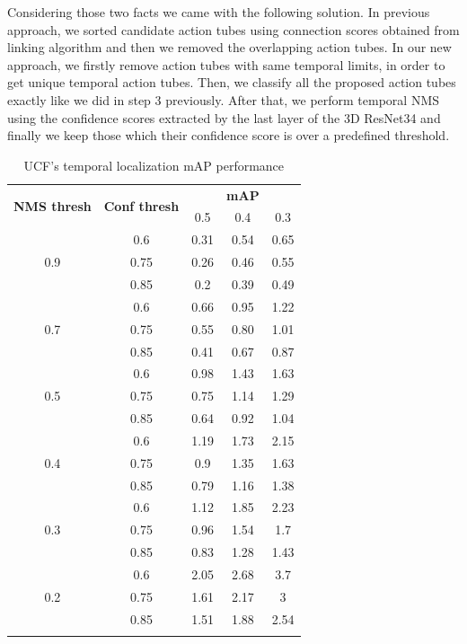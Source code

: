\documentclass{report}
\begin{document}
Considering those two facts we came with the following solution.
In previous approach, we sorted candidate action tubes using connection scores obtained from linking algorithm and then we removed
the overlapping action tubes. In our new approach, we firstly remove action tubes with same temporal limits, in order to get unique
temporal action tubes. Then, we classify all the proposed action tubes exactly like we did in step 3 previously. After that, we
perform temporal NMS using the confidence scores extracted by the last layer of the 3D ResNet34 and finally we keep those which
their confidence score is over a predefined threshold. 

\begin{center}
  \begin{longtable}{|| c | c || c c c ||}

    \hline
    \multirow{2}{*}{\textbf{NMS thresh}} & \multirow{2}{*}{\textbf{Conf thresh}} & {} & \textbf{mAP} & {}  \\
    {} & {} & 0.5 & 0.4 & 0.3\\
    \hline
    \multirow{3}{*}{0.9} & {0.6} & 0.31 & 0.54 & 0.65 \\
    \cline{2-5}
    {} & {0.75} & 0.26 & 0.46 & 0.55 \\
    \cline{2-5}
    {} & {0.85} & 0.2 & 0.39 & 0.49 \\
    \hline
    \multirow{3}{*}{0.7} & {0.6} & 0.66 & 0.95 & 1.22 \\
    \cline{2-5}
    {} & {0.75} & 0.55 & 0.80 & 1.01 \\
    \cline{2-5}
    {} & {0.85} & 0.41 & 0.67 & 0.87 \\
    \hline
    \multirow{3}{*}{0.5} & {0.6} & 0.98 & 1.43 & 1.63 \\
    \cline{2-5}
    {} & {0.75} & 0.75 & 1.14 & 1.29 \\
    \cline{2-5}
    {} & {0.85} & 0.64 & 0.92 & 1.04 \\
    \hline
    \multirow{3}{*}{0.4} & {0.6} & 1.19 & 1.73 & 2.15 \\
    \cline{2-5}
    {} & {0.75} & 0.9 & 1.35 & 1.63 \\
    \cline{2-5}
    {} & {0.85} & 0.79 & 1.16 & 1.38 \\

    \hline
    \multirow{3}{*}{0.3} & {0.6} & 1.12 & 1.85 & 2.23 \\
    \cline{2-5}
    {} & {0.75} & 0.96 & 1.54 &1.7 \\
    \cline{2-5}
    {} & {0.85} & 0.83 & 1.28 & 1.43 \\
    \hline
    \multirow{3}{*}{0.2} & {0.6} & 2.05 & 2.68 & 3.7 \\
    \cline{2-5}
    {} & {0.75} & 1.61 & 2.17 & 3 \\
    \cline{2-5}
    {} & {0.85} & 1.51 & 1.88 & 2.54 \\

    \hline

    \caption{UCF's temporal localization mAP performance}
    \label{table:temp_cls_2}
  \end{longtable}
\end{center}
\end{document}

